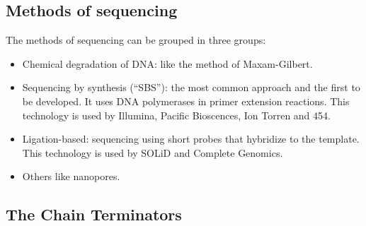     \subsection{Methods of sequencing}
    The methods of sequencing can be grouped in three groups:

    \begin{multicols}{2}
        \begin{itemize}
          \item Chemical degradation of DNA: like the method of Maxam-Gilbert.
          \item Sequencing by synthesis (“SBS”): the most common approach and the first to be developed.
              It uses DNA polymerases in primer extension reactions.
              This technology is used by Illumina, Pacific Bioscences, Ion Torren and 454.
          \item Ligation-based: sequencing using short probes that hybridize to the template.
              This technology is used by SOLiD and Complete Genomics.
          \item Others like nanopores.
        \end{itemize}
    \end{multicols}

    \subsection{The Chain Terminators}

